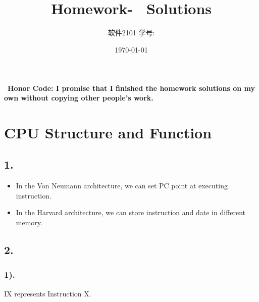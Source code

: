 \documentclass[11pt]{article}  %
\title{\vspace{-4cm}\CourseCodeName \space
        \Session \protect\\  Homework-~\textbf{\Homework} Solutions}
\author{软件2101 \Name \space 学号: \SID}
\date{\today}
\begin{document}
\maketitle

~\textbf{Honor Code: I promise that I finished the homework solutions on my own without copying other people's 
    work.}
    
\section*{CPU Structure and Function}

\subsection*{1. }

\begin{itemize}
    \item In the Von Neumann architecture, we can set PC point at executing instruction.
    \item In the Harvard architecture, we can store instruction and date in different memory.
\end{itemize}

\subsection*{2. }

\subsubsection*{1). }

IX represents Instruction X. 
\end{document}
